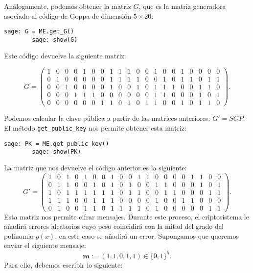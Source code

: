 \begin{exampleth}
    Análogamente, podemos obtener la matriz $G$, que es la matriz generadora asociada al código de Goppa de dimensión $5 \times 20$:

    \begin{lstlisting}[gobble=4]
        sage: G = ME.get_G()
        sage: show(G)
    \end{lstlisting}

    Este código devuelve la siguiente matriz:

    \[
        G = \left(\begin{array}{rrrrrrrrrrrrrrrrrrrr}
            1 & 0 & 0 & 0 & 1 & 0 & 0 & 1 & 1 & 1 & 0 & 0 & 1 & 0 & 0 & 1 & 0 & 0 & 0 & 0 \\
            0 & 1 & 0 & 0 & 0 & 0 & 0 & 1 & 1 & 1 & 1 & 0 & 0 & 1 & 0 & 1 & 1 & 0 & 1 & 1 \\
            0 & 0 & 1 & 0 & 0 & 0 & 0 & 1 & 0 & 0 & 1 & 0 & 1 & 1 & 1 & 0 & 0 & 1 & 1 & 0 \\
            0 & 0 & 0 & 1 & 1 & 1 & 0 & 0 & 0 & 0 & 0 & 0 & 1 & 1 & 0 & 0 & 0 & 1 & 0 & 1 \\
            0 & 0 & 0 & 0 & 0 & 0 & 1 & 1 & 0 & 1 & 0 & 1 & 1 & 0 & 0 & 1 & 0 & 1 & 1 & 0
            \end{array}\right).
    \]

    
    
    Podemos calcular la clave pública a partir de las matrices anteriores: $G' = SGP$. El método \texttt{get\_public\_key} nos permite obtener esta matriz:
    
    \begin{lstlisting}[gobble=4]
        sage: PK = ME.get_public_key()
        sage: show(PK)
    \end{lstlisting}

    La matriz que nos devuelve el código anterior es la siguiente:
    \[
        G' = \left(\begin{array}{rrrrrrrrrrrrrrrrrrrr}
            1 & 0 & 1 & 0 & 1 & 0 & 0 & 1 & 0 & 0 & 1 & 1 & 0 & 0 & 0 & 0 & 1 & 1 & 0 & 0 \\
            0 & 1 & 1 & 0 & 0 & 1 & 0 & 1 & 0 & 1 & 0 & 0 & 1 & 1 & 0 & 0 & 0 & 1 & 0 & 1 \\
            1 & 0 & 1 & 1 & 1 & 1 & 1 & 1 & 0 & 1 & 1 & 0 & 0 & 1 & 1 & 0 & 0 & 0 & 1 & 1 \\
            1 & 1 & 1 & 0 & 0 & 1 & 1 & 1 & 0 & 0 & 0 & 0 & 1 & 0 & 0 & 1 & 1 & 0 & 0 & 0 \\
            0 & 1 & 0 & 0 & 1 & 1 & 0 & 1 & 1 & 1 & 1 & 0 & 1 & 0 & 0 & 0 & 0 & 0 & 1 & 1
            \end{array}\right).
    \]
    Esta matriz nos permite cifrar mensajes. Durante este proceso, el criptosistema le añadirá errores aleatorios cuyo peso coincidirá con la mitad del grado del polinomio $g(x)$, en este caso se añadirá un error. Supongamos que queremos enviar el siguiente mensaje:
    \[
        \textbf{m} := (1, 1, 0, 1, 1) \in \{ 0, 1 \} ^5.
    \]
    Para ello, debemos escribir lo siguiente:


\end{exampleth}
